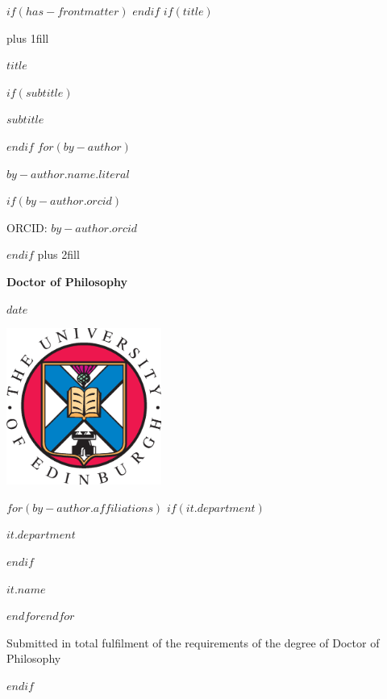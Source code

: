 $if(has-frontmatter)$
\frontmatter
$endif$
$if(title)$
\cleardoublepage
\thispagestyle{empty}
{\centering
\hbox{}\vskip 0cm plus 1fill
{\Huge\bfseries $title$ \par}
$if(subtitle)$
\vspace{3ex}
{\large\bfseries $subtitle$ \par}
$endif$
\vspace{10ex}
$for(by-author)$
{\Large\bfseries $by-author.name.literal$ \par}
$if(by-author.orcid)$
{\large ORCID: $by-author.orcid$ \par}
$endif$
\vskip 0cm plus 2fill
{\bfseries\large Doctor of Philosophy \par}
\vspace{3ex}
{\bfseries\large $date$ \par}
\vspace{5ex}

\centering%
\includegraphics[width=2in]{EdUniCrest.eps}\par%
\vspace{5ex}

$for(by-author.affiliations)$%
$if(it.department)$%
{\bfseries\large $it.department$ \par}
\vspace{3ex}
$endif$%
{\bfseries\large $it.name$ \par}
$endfor$$endfor$%
\vspace{10ex}
{\small Submitted in total fulfilment of the requirements
of the degree of Doctor of Philosophy \par}
}
$endif$

\let\mainmatterreal\mainmatter
\let\mainmatter\relax